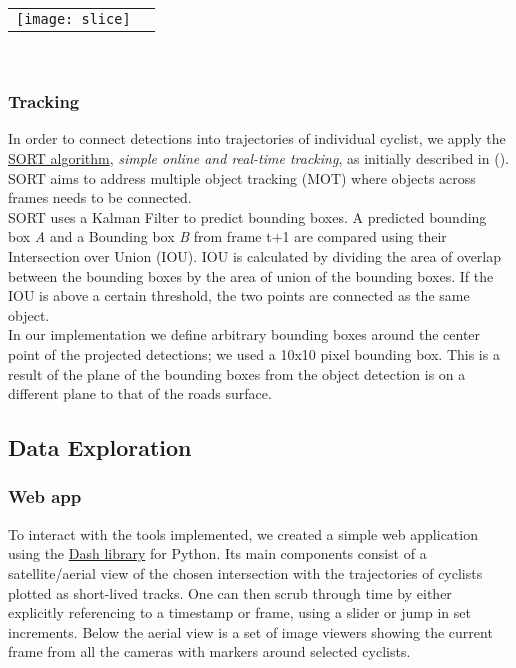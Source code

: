 \ \\ 
\noindent
\begin{tabular}{@{}cc}
\texttt{[image: slice]} 
\end{tabular}
\label{slice}
\

\subsubsection{Tracking}

In order to connect detections into trajectories of individual cyclist, we apply 
the \href{https://github.com/abewley/sort}{SORT algorithm}, \textit{simple online and real-time tracking}, as initially described in (\cite{Bewley2016_sort}). 
SORT aims to address multiple object tracking (MOT) where objects across frames needs to be connected. 
\ \\ 

SORT uses a Kalman Filter to predict bounding boxes. A predicted bounding box \textit{A} and a Bounding box \textit{B} from 
frame t+1 are compared using their Intersection over Union (IOU). IOU is calculated by dividing the area of overlap between the 
bounding boxes by the area of union of the bounding boxes. If the IOU is above a certain threshold, the two points are connected as the same object.
\ \\ 

In our implementation we define arbitrary bounding boxes around the center point of the projected detections; 
we used a 10x10 pixel bounding box. This is a result of the plane of the bounding boxes from the object detection is on
a different plane to that of the roads surface.

\subsection{Data Exploration}

\subsubsection{Web app}
To interact with the tools implemented, we created a simple web application using the \href{https://plotly.com/dash/}{Dash library} for Python. 
Its main components consist of a satellite/aerial view of the chosen intersection with the trajectories of cyclists plotted as short-lived tracks. 
One can then scrub through time by either explicitly referencing to a timestamp or frame, using a slider or jump in set increments.
Below the aerial view is a set of image viewers showing the current frame from all the cameras with markers around selected cyclists.

